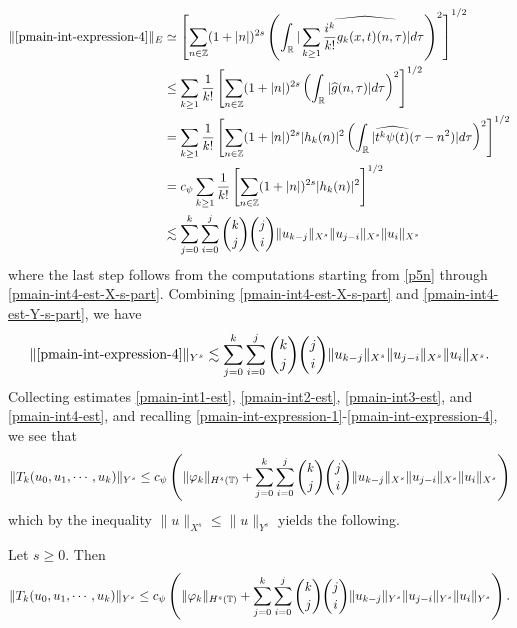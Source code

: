 \begin{equation}
\label{pmain-int4-est-Y-s-part}
  \begin{split}
    \|\eqref{pmain-int-expression-4}\|_{E}
    & \simeq \left[ \sum_{n \in
    \mathbb{Z}}(1 + | n |)^{2s} \left( \int_{\mathbb{R}} | \sum_{k \ge 1}
    \widehat{\frac{i^{k}}{k!}g_{k}(x,t)(n, \tau)} |d \tau \right)^{2} \right]^{1/2}
    \\
    & \le \sum_{k \ge 1} \frac{1}{k!} \left[ \sum_{n \in \mathbb{Z}} (1 + | n
    |)^{2s} \left( \int_{\mathbb{R}} | \widehat{g}(n, \tau) | d \tau \right)^{2}
    \right]^{1/2}
    \\
    & = \sum_{k \ge 1} \frac{1}{k!} \left[ \sum_{n \in \mathbb{Z}} (1 + | n
    |)^{2s} | h_{k}(n) |^2 \left( \int_{\mathbb{R}} | \widehat{t^{k} \psi(t)}(\tau -
    n^{2}) |d \tau \right)^{2} \right]^{1/2}
    \\
    & = c_{\psi} \sum_{k \ge 1} \frac{1}{k!} \left[ \sum_{n \in \mathbb{Z}} (1 + | n
    |)^{2s} | h_{k}(n) |^2 \right]^{1/2}
    \\
    & \lesssim 
    \sum_{j=0}^{k} \sum_{i=0}^{j} {k \choose j}{j \choose i}
    \|u_{k-j}\|_{X^s} \| u_{j-i}\|_{X^s}
    \| u_i \|_{X^s}
  \end{split}
\end{equation}
%
%
where the last step follows from the computations starting from \eqref{p5n}
through \eqref{pmain-int4-est-X-s-part}.
Combining \eqref{pmain-int4-est-X-s-part} and \eqref{pmain-int4-est-Y-s-part}, we
have
%
%
\begin{equation}
\label{pmain-int4-est}
  \begin{split}
    \|\eqref{pmain-int-expression-4}\|_{Y^s} \lesssim 
    \sum_{j=0}^{k} \sum_{i=0}^{j} {k \choose j}{j \choose i}
    \|u_{k-j}\|_{X^s} \| u_{j-i}\|_{X^s}
    \| u_i \|_{X^s}.
  \end{split}
\end{equation}
%
%
Collecting estimates \eqref{pmain-int1-est}, \eqref{pmain-int2-est}, 
\eqref{pmain-int3-est}, and \eqref{pmain-int4-est}, and recalling 
\eqref{pmain-int-expression-1}-\eqref{pmain-int-expression-4}, we see that
$$\|T_k(u_0, u_1, \cdots, u_k)\|_{Y^s} \le c_\psi \left( \|\varphi_k \|_{H^s(\mathbb{T})} + 
\sum_{j=0}^{k} \sum_{i=0}^{j} {k \choose j}{j \choose i} \|u_{k-j}\|_{X^s} \|
u_{j-i}\|_{X^s} \| u_i \|_{X^s}  \right )$$ 
which by the inequality $\|u\|_{X^s} \le \|u\|_{Y^s}$ yields the following.
%
%				 
%
\begin{proposition}
\label{pprop:contraction}
  Let $s \ge0$. Then
%
\begin{equation*}
  \begin{split}
    \|T_k(u_0, u_1, \cdots, u_k)\|_{Y^s} \le c_\psi  \left( \|\varphi_k
    \|_{H^s(\mathbb{T})} +
    \sum_{j=0}^{k} \sum_{i=0}^{j} {k \choose j}{j \choose i}
    \|u_{k-j}\|_{Y^s} \| u_{j-i}\|_{Y^s}
    \| u_i \|_{Y^s}\right).
  \end{split}
\end{equation*}
%
\end{proposition}
